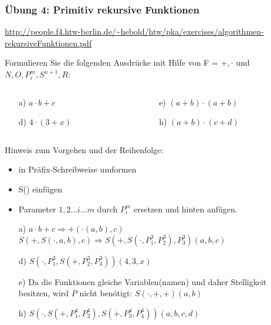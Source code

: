 \begin{card}
	\frametitle{Übung 4: Primitiv rekursive Funktionen}
	\url{http://people.f4.htw-berlin.de/~hebold/htw/pka/exercises/algorithmen-rekursiveFunktionen.pdf}
\end{card}

\begin{card}
  Formulieren Sie die folgenden Ausdrücke mit Hilfe von F = ${+, \cdot}$ und ${N, O, P^m_i, S^{n+1}, R}$:
	\begin{columns}
		\begin{column}{.5\linewidth}
			\begin{enumerate}[a)]
   			 \item[a)] $a \cdot b + c$
   			 \item[d)] $4 \cdot (3 + x)$
   			\end{enumerate}
   		\end{column}
   		\begin{column}{.5\linewidth}
			\begin{enumerate}[a)]
			\item[e)] $(a + b) \cdot (a + b)$
			\item[h)] $(a + b) \cdot (c + d)$
   			\end{enumerate}
		\end{column}
	\end{columns}
	\hr
	Hinweis zum Vorgehen und der Reihenfolge:
	\begin{itemize}
    \item in Präfix-Schreibweise umformen
    \item S() einfügen
    \item Parameter $1, 2 \dots i \dots m$ durch $P^m_i$ ersetzen und hinten anfügen.
	\end{itemize}

	\begin{enumerate}[a)]
    \item[a)]
    	$a \cdot b + c \Rightarrow +(\cdot(a,b),c)$\\
    	$S(+,S(\cdot,a,b),c) \Rightarrow S(+, S(\cdot, P^3_1, P^3_2), P^3_3)(a, b, c)$
    	\vfill
    \item[d)] $S(\cdot, P^3_1, S(+, P^3_2, P^3_3))(4, 3, x)$
    \item[e)]
    	Da die Funktionen gleiche Variablen(namen) und daher Stelligkeit besitzen, wird $P$ nicht benötigt: $S(\cdot, +, +)(a, b)$
    \item[h)] $S(\cdot, S(+, P^4_1, P^4_2), S(+, P^4_3, P^4_4))(a, b, c, d)$
	\end{enumerate}
\end{card}

